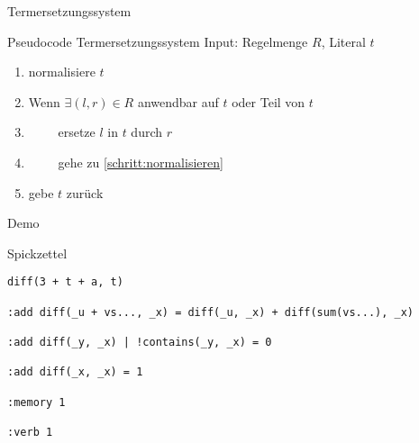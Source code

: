 \documentclass{beamer}
\begin{document}

\begin{frame}[fragile]{Termersetzungssystem}
	\begin{block}{Pseudocode Termersetzungssystem}
		Input: Regelmenge $R$, Literal $t$ \\
		
		\begin{enumerate}
			\item normalisiere $t$ \label{schritt:normalisieren}
			\item Wenn $\exists (l, r) \in R$ anwendbar auf $t$ oder Teil von $t$
			\item ~~~~ ersetze $l$ in $t$ durch $r$
			\item ~~~~ gehe zu \ref{schritt:normalisieren}
			\item gebe $t$ zurück
		\end{enumerate}
	\end{block}
\end{frame}


\begin{frame}[fragile]{Demo}
	\pause
	\begin{block}{Spickzettel}
		\footnotesize
		\begin{verbatim}
diff(3 + t + a, t)

:add diff(_u + vs..., _x) = diff(_u, _x) + diff(sum(vs...), _x)

:add diff(_y, _x) | !contains(_y, _x) = 0

:add diff(_x, _x) = 1

:memory 1

:verb 1
		\end{verbatim}
	\end{block}
\end{frame}

\end{document}
